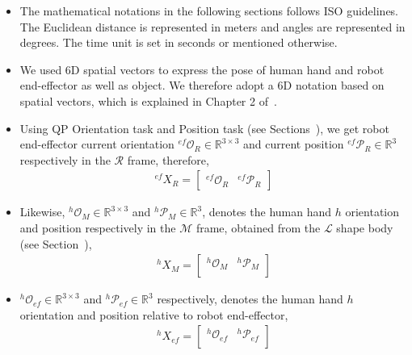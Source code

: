 \documentclass[a4paper, 12pt, oneside]{Thesis}  %
\begin{document}
\begin{itemize}
	\item The mathematical notations in the following sections follows ISO guidelines. The Euclidean distance is represented in meters and angles are represented in degrees. The time unit is set in seconds or mentioned otherwise.
	
	\item We used 6D spatial vectors to express the pose of human hand and robot end-effector as well as object. We therefore adopt a 6D notation based on spatial vectors, which is explained in Chapter 2 of~\cite{featherstone2014rigid}.
	
	\item Using QP Orientation task and Position task (see Sections~), we get robot end-effector current orientation ${{}^{ef}\mathcal{O}_R} \in \mathbb{R}^{3\times3}$ and current position ${{}^{ef}\mathcal{P}_R} \in \mathbb{R}^{3}$ respectively in the $\mathcal{R}$ frame, therefore,
	\begin{gather}\label{X_R_ef}
	{}^{ef}{X}_R =
	\left[\begin{array}{cc}
	{}^{ef}\mathcal{O}_R & {}^{ef}\mathcal{P}_R
	\end{array}\right]
	\end{gather}
	
	\item Likewise, ${{}^{h}\mathcal{O}_M} \in \mathbb{R}^{3\times3}$ and ${{}^{h}\mathcal{P}_M} \in \mathbb{R}^{3}$, denotes the human hand $h$ orientation and position respectively in the $\mathcal{M}$ frame, obtained from the $\mathcal{L}$ shape body (see Section~),
	\begin{gather}\label{X_M_h}
	{}^{h}{X}_M =
	\left[\begin{array}{cc}
	{}^{h}\mathcal{O}_M & {}^{h}\mathcal{P}_M \\
	\end{array}\right]
	\end{gather}
	
	\item ${{}^{h}\mathcal{O}_{ef}} \in \mathbb{R}^{3\times3}$ and ${{}^{h}\mathcal{P}_{ef}} \in \mathbb{R}^{3}$ respectively, denotes the human hand $h$ orientation and position relative to robot end-effector,
	\begin{gather}\label{X_ef_h}
	{}^{h}{X}_{ef} =
	\left[\begin{array}{cc}
	{}^{h}\mathcal{O}_{ef} & {}^{h}\mathcal{P}_{ef} \\
	\end{array}\right]
	\end{gather}
	

\end{itemize}
\end{document}
